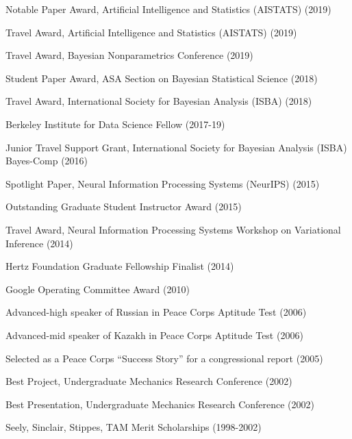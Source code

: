 \documentclass[margin,line]{res}
\newenvironment{list1}{
  \begin{list}{\ding{113}}{%
      \setlength{\itemsep}{0in}
      \setlength{\parsep}{0in} \setlength{\parskip}{0in}
      \setlength{\topsep}{0in} \setlength{\partopsep}{0in}
      \setlength{\leftmargin}{0in}}}{\end{list}} %
\begin{document}
\begin{resume}
\begin{list1}
\item[] Notable Paper Award, Artificial Intelligence and Statistics (AISTATS) (2019)
\item[] Travel Award, Artificial Intelligence and Statistics (AISTATS) (2019)
\item[] Travel Award, Bayesian Nonparametrics Conference (2019)
\item[] Student Paper Award, ASA Section on Bayesian Statistical Science (2018)
\item[] Travel Award, International Society for Bayesian Analysis (ISBA) (2018)
\item[] Berkeley Institute for Data Science Fellow (2017-19)
\item[] Junior Travel Support Grant, International Society for Bayesian Analysis (ISBA) Bayes-Comp (2016)
\item[] Spotlight Paper, Neural Information Processing Systems (NeurIPS) (2015)
\item[] Outstanding Graduate Student Instructor Award (2015)
\item[] Travel Award, Neural Information Processing Systems Workshop on Variational Inference (2014)
\item[] Hertz Foundation Graduate Fellowship Finalist (2014)
\item[] Google Operating Committee Award (2010)
\item[] Advanced-high speaker of Russian in Peace Corps Aptitude Test (2006)
\item[] Advanced-mid speaker of Kazakh in Peace Corps Aptitude Test (2006)
\item[] Selected as a Peace Corps ``Success Story'' for a congressional report (2005)
\item[] Best Project, Undergraduate Mechanics Research Conference (2002)
\item[] Best Presentation, Undergraduate Mechanics Research Conference (2002)
\item[] Seely, Sinclair, Stippes, TAM Merit Scholarships (1998-2002)

\end{list1}


%



\end{resume}
\end{document}
